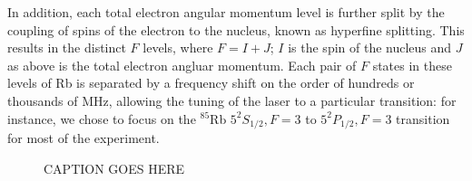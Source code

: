 In addition, each total electron angular momentum level is further
split by the coupling of spins of the electron to the nucleus, known
as hyperfine splitting. This results in the distinct $F$ levels, where
$F = I + J$; $I$ is the spin of the nucleus and $J$ as above is the
total electron angluar momentum. Each pair of $F$ states in these
levels of Rb is separated by a frequency shift on the order of
hundreds or thousands of MHz, allowing the tuning of the laser to a
particular transition: for instance, we chose to focus on the
$^{85}$Rb $5^2S_{1/2}, F = 3$ to $5^2P_{1/2}, F = 3$ transition for
most of the experiment.

\begin{figure}[h]
\begin{center}
\hspace{-1mm}
\vspace{-2mm}
\vspace{-2mm}
\caption{\small{CAPTION GOES HERE}}
\label{fig:8587levels}
\end{center}
\end{figure}


